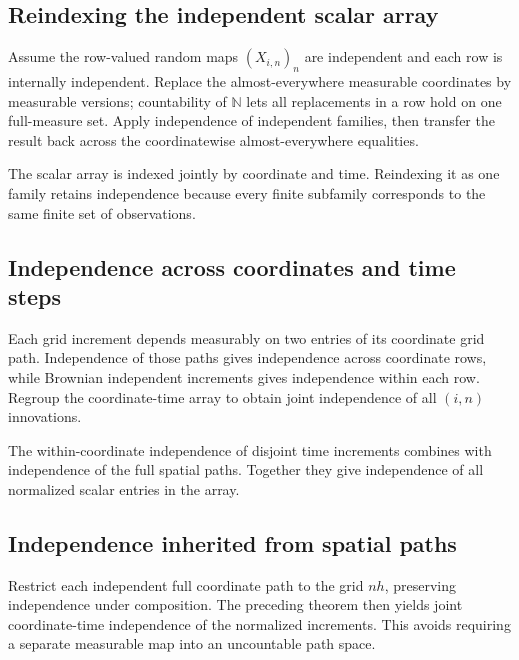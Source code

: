 \documentclass[11pt,a4paper]{article}
\begin{document}
\subsection{\texorpdfstring{Reindexing the independent scalar array}{Reindexing the independent scalar array}}


Assume the row-valued random maps \((X_{i,n})_n\) are independent and each row is internally independent. Replace the almost-everywhere measurable coordinates by measurable versions; countability of \(\mathbb N\) lets all replacements in a row hold on one full-measure set. Apply independence of independent families, then transfer the result back across the coordinatewise almost-everywhere equalities.



The scalar array is indexed jointly by coordinate and time. Reindexing it as one family retains independence because every finite subfamily corresponds to the same finite set of observations.


\subsection{\texorpdfstring{Independence across coordinates and time steps}{Independence across coordinates and time steps}}


Each grid increment depends measurably on two entries of its coordinate grid path. Independence of those paths gives independence across coordinate rows, while Brownian independent increments gives independence within each row. Regroup the coordinate-time array to obtain joint independence of all \((i,n)\) innovations.



The within-coordinate independence of disjoint time increments combines with independence of the full spatial paths. Together they give independence of all normalized scalar entries in the array.


\subsection{\texorpdfstring{Independence inherited from spatial paths}{Independence inherited from spatial paths}}


Restrict each independent full coordinate path to the grid \(nh\), preserving independence under composition. The preceding theorem then yields joint coordinate-time independence of the normalized increments. This avoids requiring a separate measurable map into an uncountable path space.
\end{document}
